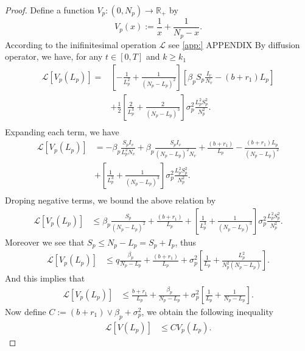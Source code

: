 \begin{proof}
		Define a function $V_p:(0,N_p)\rightarrow \mathbb{R}_+$ by
%	
	\begin{equation*}
		V_p(x) := 
			\frac{1}{x} + 
			\frac{1}{N_p-x}.
	\end{equation*}
%	
	According to the inifinitesimal operation $\mathcal{L}$
	see \autoref{app:} APPENDIX
	By diffusion operator, we have, for any $t\in [0,T]$ and $k\geq k_1$ 
%
	\begin{align*}
		\mathcal{L}[V_p(L_p)] 
			=&	
				\left[
					-\frac{1}{L_p^2} + 
					\frac{1}{(N_p - L_p) ^ 2}
				\right]
				\left[
					\beta_p S_p 
					\frac{I_v}{N_v} - 
					(b + r_1) L_p\right]
				\\
			&+
				\frac{1}{2}
				\left[
					\frac{2}{L_p^3} + 
					\frac{2}{(N_p - L_p)^3}
				\right]
				\sigma_p ^ 2
				\frac{L_p^2 S_p^2}{N_p^2}.
			\\
	\end{align*}
%	
	Expanding each term, we have
	\begin{align*}
		\mathcal{L}[V_p(L_p)] 
			&=	
				-\beta_p \frac{S_p I_v}{L_p^2 N_v} + 
				\beta_p \frac{S_p I_v}{(N_p -L_p) ^ 2 N_v} + 
				\frac{(b + r_1)}{L_p} - 
				\frac{(b+r_1)L_p}{(N_p-L_p)^2}
				\\
			&+
				\left[
					\frac{1}{L_p^3} + 
					\frac{1}{(N_p-L_p)^3}
				\right]
				\sigma_p ^ 2
				\frac{L_p^2 S_p^2}{N_p^2}.
				\\
	\end{align*}
%	
	Droping negative terms, we bound the above relation by
	\begin{align*}
		\mathcal{L}[V_p(L_p)] 
			&\leq	
				\beta_p 
				\frac{S_p}{(N_p - L_p) ^ 2} + 
				\frac{(b + r_1)}{L_p} + 
				\left[
					\frac{1}{L_p^3} + 
					\frac{1}{(N_p-L_p)^3}
				\right]
				\sigma_p ^ 2
				\frac{L_p ^ 2 S_p ^ 2}{N_p ^ 2}.
	\end{align*}
	Moreover we see that $S_p\leq N_p-L_p=S_p+I_p$, thus
	\begin{align*}
		\mathcal{L}[V_p(L_p)] 
			&\le q		
				\frac{\beta_p}{N_p -L_p} + 
				\frac{(b + r_1)}{L_p} + 
				\sigma_p^2
				\left[
					\frac{1}{L_p} + 
					\frac{L_p^2}{N_p^2(N_p-L_p)}
				\right].
	\end{align*}
	And this implies that
	\begin{align*}
		\mathcal{L}[V_p(L_p)] 
			&\leq		
			\frac{b+r_1}{L_p} + 
			\frac{\beta_p}{N_p -L_p} +  
			\sigma_p^2
			\left[
				\frac{1}{L_p} + 
				\frac{1}{N_p-L_p}
			\right].
	\end{align*}
	Now define $C := (b+r_1) \vee \beta_p +\sigma_p^2$, we obtain the 
	following inequality
	\begin{align}\label{Positive2}
		\mathcal{L}[V(L_p)] 
			&\leq		
				C V_p(L_p).
	\end{align}
%
	

\end{proof}
